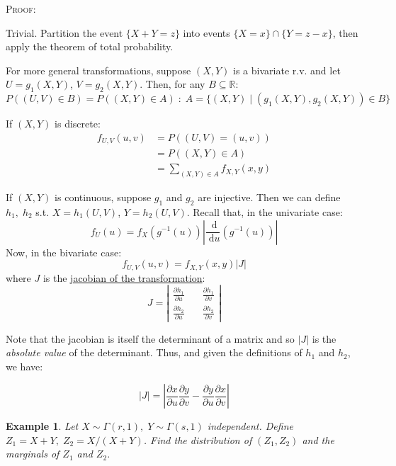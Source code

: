 \documentclass[12pt,a4paper]{article}
\newcommand{\diff}{\;\mathrm{d}}
\newtheorem{ex}[thm]{Example}
\begin{document}
\noindent\textsc{Proof:}\par\vspace{1cm}
\indent Trivial. Partition the event $\{X+Y=z\}$ into events $\{X=x\}\cap\{Y=z-x\}$, then apply the theorem of total probability.\par\vspace{1cm}

For more general transformations, suppose $(X,Y)$ is a bivariate r.v. and let $U=g_1(X,Y)$, $V=g_2(X,Y)$. Then, for any $B \subseteq \mathbb{R}$:
$$P((U,V)\in B) = P((X,Y) \in A)\; : \; A =\{(X,Y)\; | \; (g_1(X,Y),g_2(X,Y)) \in B\}$$

\noindent If $(X,Y)$ is discrete:
\begin{align*}
f_{U,V}(u,v) &= P((U,V)=(u,v))\\
&= P((X,Y)\in A)\\
&= \!\!\!\!\!\!\!\sum\limits_{(X,Y)\in A} \!\!\!\!\!\!\!\!f_{X,Y}(x,y)
\end{align*}

If $(X,Y)$ is continuous, suppose $g_1$ and $g_2$ are injective. Then we can define $h_1,\; h_2$ s.t. $X=h_1(U,V)$, $Y=h_2(U,V)$. Recall that, in the univariate case:
$$f_U(u) = f_X\left(g^{-1}(u)\right) \left| \frac{\diff}{\diff u}\left(g^{-1}(u)\right)\right|$$
Now, in the bivariate case:
$$f_{U,V}(u,v) = f_{X,Y}(x,y)|J|$$
where $J$ is the \underline{jacobian of the transformation}:
\begingroup
\renewcommand*{\arraystretch}{1.5}
$$J = \left|\begin{array}{cc} \frac{\partial h_1}{\partial u}\quad & \frac{\partial h_1}{\partial v}\\ \frac{\partial h_2}{\partial u}\quad & \frac{\partial h_2}{\partial v}\end{array}\right|$$
\endgroup

Note that the jacobian is itself the determinant of a matrix and so $|J|$ is the \emph{absolute value} of the determinant. Thus, and given the definitions of $h_1$ and $h_2$, we have:

$$|J| = \left| \frac{\partial x}{\partial u}\frac{\partial y}{\partial v} - \frac{\partial y}{\partial u}\frac{\partial x}{\partial v}\right|$$

\begin{ex}
\vspace{1cm}

Let $X \sim \Gamma(r,1),\; Y \sim \Gamma(s,1)$ independent. Define $Z_1=X+Y,\; Z_2=X/(X+Y)$. Find the distribution of $(Z_1,Z_2)$ and the marginals of $Z_1$ and $Z_2$.
\end{ex}
\end{document}
